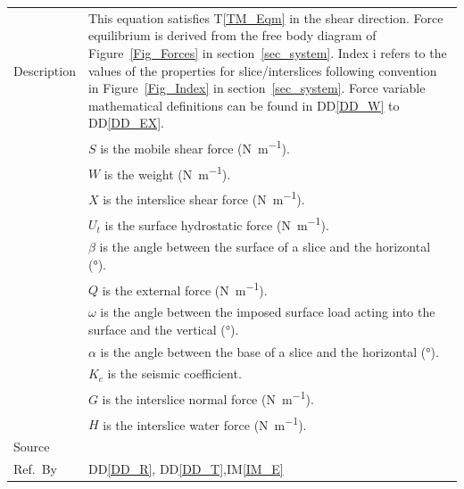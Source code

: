 \documentclass[12pt]{article}
\newcommand{\colAwidth}{0.13\textwidth}
\newcommand{\colBwidth}{0.82\textwidth}
\newcommand{\tref}[1]{T\ref{#1}}
\newcommand{\iref}[1]{IM\ref{#1}}
\newcommand{\ddref}[1]{DD\ref{#1}}
\begin{document}
\begin{minipage}{\textwidth}
\begin{tabular}{| p{\colAwidth} | p{\colBwidth}|}
  \hline Description & This equation satisfies \tref{TM_Eqm} in the shear 
  direction. Force equilibrium is derived from the free body diagram of 
  Figure~\ref{Fig_Forces} in section~\ref{sec_system}. Index $\text{i}$ refers 
  to the values of the properties for slice/interslices following convention in
  Figure~\ref{Fig_Index} in section~\ref{sec_system}. Force variable
  mathematical definitions can be found in \ddref{DD_W} to \ddref{DD_EX}.\\
  &$S$ is the mobile shear force (\si{\newton\per\meter}). \\
  &$W$ is the weight (\si{\newton\per\meter}). \\
  &$X$ is the interslice shear force (\si{\newton\per\meter}). \\
  &$U_t$ is the surface hydrostatic force (\si{\newton\per\meter}). \\
  &$\beta$ is the angle between the surface of a slice and the 
  horizontal (\si{\degree}). \\
  &$Q$ is the external force (\si{\newton\per\meter}). \\
  &$\omega$ is the angle between the imposed surface load acting into 
  the surface and the vertical (\si{\degree}). \\
  &$\alpha$ is the angle between the base of a slice and the 
  horizontal (\si{\degree}). \\
  &$K_c$ is the seismic coefficient. \\
  &$G$ is the interslice normal force (\si{\newton\per\meter}). \\
  &$H$ is the interslice water force (\si{\newton\per\meter}). \\

  \hline Source & \cite{ZhuEtAl2005}\\
  
  \hline Ref.\ By & \ddref{DD_R}, \ddref{DD_T},\iref{IM_E}\\
  
  \hline
\end{tabular}
\end{minipage}\\

~\newline
\end{document}
